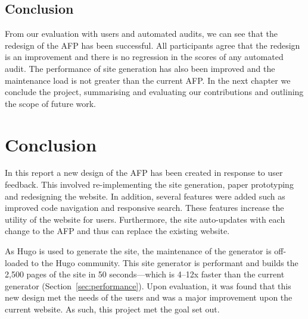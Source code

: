 \documentclass[bsc,frontabs,oneside,singlespacing,parskip,deptreport,logo]{infthesis}
\begin{document}



\section{Conclusion}

From our evaluation with users and automated audits, we can see that the redesign of the AFP has been successful. All participants agree that the redesign is an improvement and there is no regression in the scores of any automated audit. The performance of site generation has also been improved and the maintenance load is not greater than the current AFP. In the next chapter we conclude the project, summarising and evaluating our contributions and outlining the scope of future work.



\chapter{Conclusion} \label{conclusion}


In this report a new design of the AFP has been created in response to user feedback. This involved re-implementing the site generation, paper prototyping and redesigning the website. In addition, several features were added such as improved code navigation and responsive search. These features increase the utility of the website for users. Furthermore, the site auto-updates with each change to the AFP and thus can replace the existing website.

As Hugo is used to generate the site, the maintenance of the generator is off-loaded to the Hugo community. This site generator is performant and builds the 2,500 pages of the site in 50 seconds---which is 4--12x faster than the current generator (Section~\ref{sec:performance}). Upon evaluation, it was found that this new design met the needs of the users and was a major improvement upon the current website. As such, this project met the goal set out.
\end{document}
